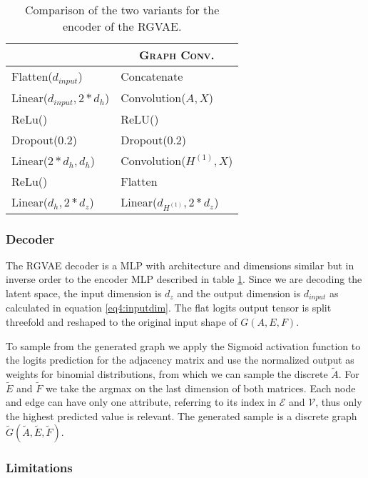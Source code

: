 \begin{table}[H]
    \centering
        \begin{tabular}{|l|l|}
        \hline
        \rowcolor[HTML]{EFEFEF}
        \multicolumn{1}{|c}{\textsc{MLP}} & \multicolumn{1}{c}{\textsc{Graph Conv.}} \\\hline
        Flatten($d_{input}$) &   Concatenate \\
        Linear($d_{input},2*d_{h}$) &   Convolution($A,X$) \\
        ReLu() &   ReLU() \\   
        Dropout($0.2$) &   Dropout($0.2$) \\
        Linear($2*d_{h},d_{h}$) &   Convolution($H^{(1)},X$) \\
        ReLu() &   Flatten \\
        Linear($d_{h},2*d_{z}$) &   Linear($d_{H^{(1)}},2*d_z$) \\
        \hline
        \end{tabular}
        \caption{Comparison of the two variants for the encoder of the RGVAE.}
        \label{tab4:archcompare}
    \end{table}

\subsubsection{Decoder}


The RGVAE decoder is a MLP with architecture and dimensions similar but in inverse order to the encoder MLP described in table \ref{tab4:archcompare}. Since we are decoding the latent space, the input dimension is $d_z$ and the output dimension is $d_{input}$ as calculated in equation \ref{eq4:inputdim}. The flat logits output tensor is split threefold and reshaped to the original input shape of $G(A,E,F)$.   


To sample from the generated graph we apply the Sigmoid activation function to the logits prediction for the adjacency matrix and use the normalized output as weights for binomial distributions, from which we can sample the discrete $\tilde{A}$. For $\tilde{E}$ and $\tilde{F}$ we take the argmax on the last dimension of both matrices. Each node and edge can have only one attribute, referring to its index in $\mathcal{E}$ and $\mathcal{V}$, thus only the highest predicted value is relevant. The generated sample is a discrete graph $\tilde{G}(\tilde{A},\tilde{E},\tilde{F})$.


\subsubsection{Limitations}

